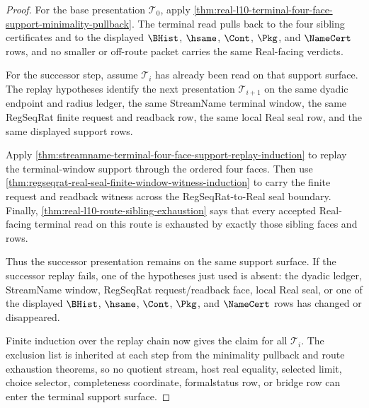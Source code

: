 \begin{proof}
For the base presentation $\mathcal T_0$, apply
\autoref{thm:real-l10-terminal-four-face-support-minimality-pullback}. The
terminal read pulls back to the four sibling certificates and to the displayed
$\BHist$, $\hsame$, $\Cont$, $\Pkg$, and $\NameCert$ rows, and no smaller or
off-route packet carries the same Real-facing verdicts.

For the successor step, assume $\mathcal T_i$ has already been read on that
support surface. The replay hypotheses identify the next presentation
$\mathcal T_{i+1}$ on the same dyadic endpoint and radius ledger, the same
StreamName terminal window, the same RegSeqRat finite request and readback
row, the same local Real seal row, and the same displayed support rows.

Apply
\autoref{thm:streamname-terminal-four-face-support-replay-induction} to replay
the terminal-window support through the ordered four faces. Then use
\autoref{thm:regseqrat-real-seal-finite-window-witness-induction} to carry the
finite request and readback witness across the RegSeqRat-to-Real seal
boundary. Finally,
\autoref{thm:real-l10-route-sibling-exhaustion} says that every accepted
Real-facing terminal read on this route is exhausted by exactly those sibling
faces and rows.

Thus the successor presentation remains on the same support surface. If the
successor replay fails, one of the hypotheses just used is absent: the dyadic
ledger, StreamName window, RegSeqRat request/readback face, local Real seal,
or one of the displayed $\BHist$, $\hsame$, $\Cont$, $\Pkg$, and $\NameCert$
rows has changed or disappeared.

Finite induction over the replay chain now gives the claim for all
$\mathcal T_i$. The exclusion list is inherited at each step from the
minimality pullback and route exhaustion theorems, so no quotient stream, host
real equality, selected limit, choice selector, completeness coordinate,
formalstatus row, or bridge row can enter the terminal support surface.
\end{proof}


